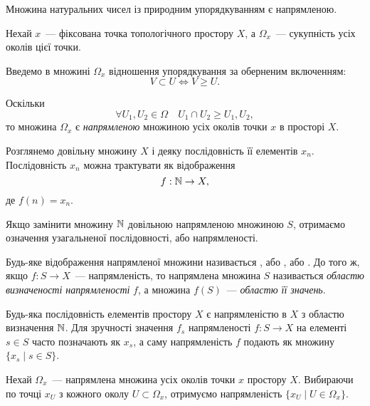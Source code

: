 \begin{example}
    Множина натуральних чисел із природним упорядкуванням є напрямленою.
\end{example}

\begin{example}
    Нехай $x$~--- фіксована точка топологічного простору $X$, а $\Omega_x$~--- сукупність усіх околів цієї точки. 

    Введемо в множині $\Omega_x$ відношення упорядкування за оберненим включенням:
    \begin{equation*}
        V \subset U \iff V \ge U.
    \end{equation*}

    Оскільки
    \begin{equation*}
        \forall U_1, U_2 \in \Omega \quad U_1 \cap U_2 \ge U_1, U_2, 
    \end{equation*}
    то множина $\Omega_x$ є \emph{напрямленою} множиною усіх околів точки $x$ в просторі $X$.
\end{example}

Розглянемо довільну множину $X$ і деяку послідовність її елементів $x_n$. Послідовність $x_n$ можна трактувати як відображення
\begin{equation*}
    f: \mathbb{N} \to X,
\end{equation*}
де $f(n) = x_n$. 

Якщо замінити множину $\mathbb{N}$ довільною напрямленою множиною $S$, отримаємо означення узагальненої послідовності, або напрямленості.

\begin{definition}
    Будь-яке відображення напрямленої множини називається , або , або . До того ж, якщо $f: S \to X$~--- напрямленість, то напрямлена множина $S$ називається \emph{областю визначеності напрямленості} $f$, а множина $f(S)$~--- \emph{областю її значень}.
\end{definition}

\begin{remark}
    Будь-яка послідовність елементів простору $X$ є напрямленістю в $X$ з областю визначення $\mathbb{N}$. Для зручності значення $f_s$ напрямленості $f: S \to X$ на елементі $s \in S$ часто позначають як $x_s$, а саму напрямленість $f$ подають як множину $\{x_s \mid s \in S\}$.
\end{remark}

\begin{example}
    Нехай $\Omega_x$~--- напрямлена множина усіх околів точки $x$ простору $X$. Вибираючи по точці $x_U$ з кожного околу $U \subset \Omega_x$, отримуємо напрямленість $\{x_U \mid U \in \Omega_x\}$.
\end{example}

